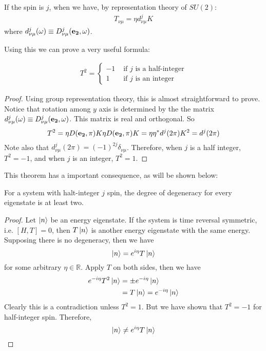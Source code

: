 \documentclass{article}
\begin{document}
If the spin is $j$, when we have, by representation theory of $SU(2)$:
\begin{align}
    T_{\nu\mu} = \eta d^j_{\nu\mu} K
\end{align}
where $d^j_{\nu\mu}(\omega)\equiv D^j_{\nu\mu}(\vb{e_2},\omega)$.

Using this we can prove a very useful formula:
\begin{thm} \begin{align}
    \label{eq:TRoper.TRoper.square_minus}
    T^2=
    \begin{cases}
        -1 & \text{ if $j$ is a half-integer} \\
        1 & \text{ if $j$ is an integer}
    \end{cases}
\end{align} \end{thm}
\begin{proof}
    Using group representation theory, this is almost straightforward to prove.
    Notice that rotation among $y$ axis is determined by the the matrix
    $d^j_{\nu\mu}(\omega)\equiv D^j_{\nu\mu}(\vb{e_2},\omega)$. This matrix is
    real and orthogonal. So
    $$T^2=\eta D(\vb{e_2},\pi) K \eta D(\vb{e_2},\pi) K = \eta\eta^* d^j(2\pi)K^2 = d^j(2\pi)$$
    Note also that $d^j_{\nu\mu}(2\pi) = (-1)^{2j}\delta_{\nu\mu}$. Therefore,
    when $j$ is a half integer, $T^2=-1$, and when $j$ is an integer, $T^2=1$.
\end{proof}

This theorem has a important consequence, as will be shown below:

\begin{thm}
    For a system with halt-integer $j$ spin, the degree of degeneracy for every
    eigenstate is at least two.
\end{thm}
\begin{proof}
    Let $\ket{n}$ be an energy eigenstate. If the system is time
    reversal symmetric, i.e. $[H,T]=0$, then $T \ket{n}$ is
    another energy eigenstate with the same energy. Supposing there is
    no degeneracy, then we have
    $$ \ket{n} = e^{i\eta}T\ket{n}$$
    for some arbitrary $\eta\in \mathbb{R}$. Apply $T$ on both sides, then
    we have
    \begin{align*}
        e^{-i\eta} T^2 \ket{n} &= \pm e^{-i\eta}\ket{n} \\
        &= T \ket{n} = e^{-i\eta} \ket{n}
    \end{align*}
    Clearly this is a contradiction unless $T^2=1$. But we have shown that
    $T^2=-1$ for half-integer spin. Therefore, 
    $$ \ket{n} \neq e^{i\eta}T\ket{n}$$
\end{proof}
\end{document}
